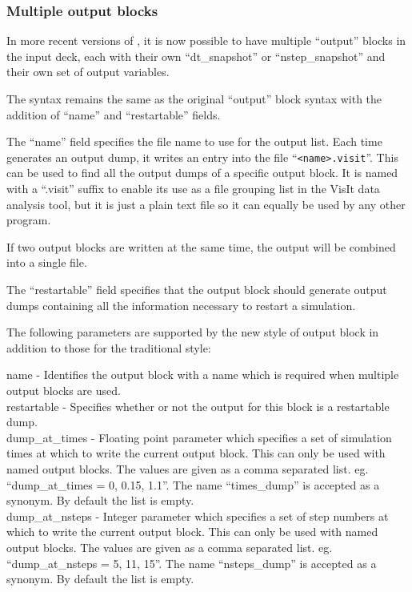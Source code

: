 \subsubsection{Multiple output blocks}
\label{sec:multiple_output}

In more recent versions of {\EPOCH}, it is now possible to have multiple
``output'' blocks in the input deck,
each with their own ``dt\_snapshot'' or ``nstep\_snapshot'' and their
own set of output variables.

The syntax remains the same as the original ``output'' block syntax with the
addition of ``name'' and ``restartable'' fields.

The ``name'' field specifies the file name to use for the output list. Each
time {\EPOCH} generates an output dump, it writes an entry into the file
``\verb|<name>.visit|''. This can be used to find all the output dumps of a
specific output block. It is named with a ``.visit'' suffix to enable its use as
a file grouping list in the VisIt data analysis tool, but it is just a plain
text file so it can equally be used by any other program.

If two output blocks are written at the same time, the output will be combined
into a single file.

The ``restartable'' field specifies that the output block should
generate output dumps containing all the information necessary
to restart a simulation.

The following parameters are supported by the new style of output block in
addition to those for the traditional style:

{\emphtext name} - Identifies the output block with a name which is required
  when multiple output blocks are used.\\

{\emphtext restartable} - Specifies whether or not the output for this
  block is a restartable dump.\\

{\emphtext dump\_at\_times} - Floating point parameter which specifies a
  set of simulation times at which to write the current output block. This
  can only be used with named output blocks. The values are given as a
  comma separated list. eg. ``dump\_at\_times = 0, 0.15, 1.1''. The name
  ``times\_dump'' is accepted as a synonym. By default
  the list is empty.\\

{\emphtext dump\_at\_nsteps} - Integer parameter which specifies a
  set of step numbers at which to write the current output block. This
  can only be used with named output blocks. The values are given as a
  comma separated list. eg. ``dump\_at\_nsteps = 5, 11, 15''. The name
  ``nsteps\_dump'' is accepted as a synonym. By default
  the list is empty.\\

